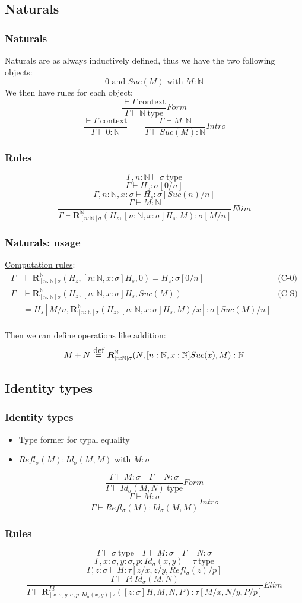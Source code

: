\documentclass[aspectratio=169]{beamer}
\newcommand{\cntxt}{\ \mathrm{context}}
\newcommand{\typ}{\ \mathrm{type}}
\newcommand{\N}{\mathbb{N}}
\newcommand{\RN}[3]{\mathbold{R}_{[n: \N]\sigma}^{\N}(#1, #2, #3)}
\newcommand{\Intro}{Intro}
\newcommand{\F}{Form}
\newcommand{\E}{Elim}
\newcommand\defeq{\stackrel{\mathclap{\normalfont\mbox{def}}}{\ =\ }}
\newcommand{\Id}[2]{Id_\sigma(#1,#2)}
\newcommand{\Refl}[1]{Refl_\sigma(#1)}
\newcommand{\RID}[4]{\mathbold{R}_{[x:\sigma,y:\sigma,p:Id_\sigma(x,y)]\tau}^{Id}(#1, #2, #3, #4)}
\newcommand{\bn}{[n:\N,x:\sigma]}
\newcommand{\Gamdash}{\Gamma\vdash}
\begin{document}
    \subsection{Naturals}
    \begin{frame}
        \frametitle{Naturals}
        Naturals are as always inductively defined, thus we have the two following objects:
        $$0 \text{ and } Suc(M) \text{ with } M:\N$$
        \vspace{10pt}
        We then have rules for each object:
        $$\frac{\vdash \Gamma \cntxt}{\Gamma \vdash \N \typ}\F$$
        $$\frac{\vdash \Gamma \cntxt}{\Gamma \vdash 0 : \N}\qquad \frac{\Gamma \vdash M : \N}{\Gamma \vdash Suc(M):\N}\Intro$$
    \end{frame}
    \begin{frame}
        \frametitle{Rules}
        
        $$\Gamma,n:\N\vdash\sigma\typ$$
        $$\Gamdash H_z : \sigma[0/n]$$
        $$\Gamma,n:\N,x:\sigma\vdash H_s : \sigma[Suc(n)/n]$$
        $$\frac{\Gamdash M: \N}{\Gamdash\RN{H_z}{[n:\N,x:\sigma]H_s}{M}:\sigma[M/n]}\E$$
    \end{frame}
    \begin{frame}
        \frametitle{Naturals: usage}
        \underline{Computation rules}:
        \begin{align*}
            \Gamma &\vdash \RN{H_z}{\bn H_s}{0} = H_z: \sigma[0/n] &\text{(C-0)}\\
            \Gamma &\vdash \RN{H_z}{\bn H_s}{Suc(M)} &\text{(C-S)}\\
            &= H_s[M/n,\RN{H_z}{\bn H_s}{M}/x]:\sigma[Suc(M)/n]
        \end{align*}
        \vspace{10pt}\\
        Then we can define operations like addition:
        $$M + N \defeq \RN{N}{[n:\N, x:\N]Suc(x)}{M}:\N$$
    \end{frame}
    \subsection{Identity types}
    \begin{frame}
        \frametitle{Identity types}
        \begin{itemize}
            \item Type former for typal equality
            \item $\Refl{M} : \Id{M}{M}$ with $M : \sigma$
        \end{itemize}
        \vspace{20pt}
        $$\frac{\Gamdash M:\sigma \quad \Gamdash N:\sigma}{\Gamma \vdash \Id{M}{N} \typ}\F$$
        \vspace{15pt}
        $$\frac{\Gamdash M:\sigma}{\Gamdash\Refl{M}:\Id{M}{M}}\Intro$$
    \end{frame}
    \begin{frame}
        \frametitle{Rules}
        $$\Gamdash\sigma\typ\quad\Gamdash M:\sigma\quad\Gamdash N:\sigma$$
        $$\Gamma, x:\sigma,y:\sigma,p:\Id{x}{y}\vdash\tau\typ$$
        $$\Gamma,z:\sigma\vdash H:\tau[z/x,z/y,\Refl{z}/p]$$
        $$\frac{\Gamdash P:\Id{M}{N}}{\Gamdash\RID{[z:\sigma]H}{M}{N}{P}:\tau[M/x,N/y,P/p]}\E$$
    \end{frame}
\end{document}
